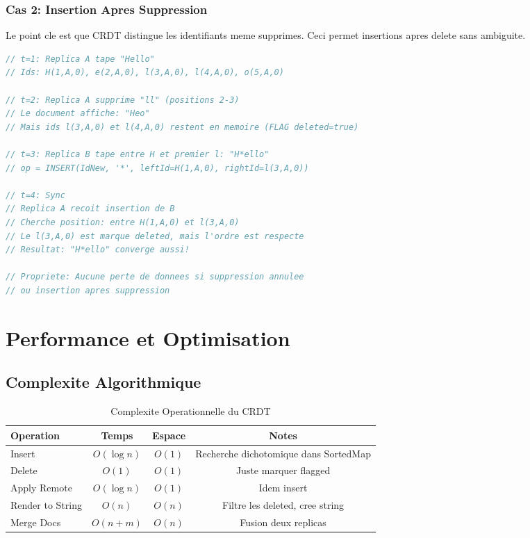 \documentclass[11pt,a4paper,hidelinks]{book}
\begin{document}
\subsubsection{Cas 2: Insertion Apres Suppression}

Le point cle est que CRDT distingue les identifiants meme supprimes. Ceci permet insertions apres delete sans ambiguite.

\begin{lstlisting}[language=Java, caption={Gestion Suppr/Insertion}]
// t=1: Replica A tape "Hello"
// Ids: H(1,A,0), e(2,A,0), l(3,A,0), l(4,A,0), o(5,A,0)

// t=2: Replica A supprime "ll" (positions 2-3)
// Le document affiche: "Heo"
// Mais ids l(3,A,0) et l(4,A,0) restent en memoire (FLAG deleted=true)

// t=3: Replica B tape entre H et premier l: "H*ello"
// op = INSERT(IdNew, '*', leftId=H(1,A,0), rightId=l(3,A,0))

// t=4: Sync
// Replica A recoit insertion de B
// Cherche position: entre H(1,A,0) et l(3,A,0)
// Le l(3,A,0) est marque deleted, mais l'ordre est respecte
// Resultat: "H*ello" converge aussi!

// Propriete: Aucune perte de donnees si suppression annulee
// ou insertion apres suppression
\end{lstlisting}

\section{Performance et Optimisation}

\subsection{Complexite Algorithmique}

\begin{table}[H]
\centering
\caption{Complexite Operationnelle du CRDT}
\begin{tabularx}{\textwidth}{l c c c}
\toprule
\textbf{Operation} & \textbf{Temps} & \textbf{Espace} & \textbf{Notes} \\
\midrule
Insert & $O(\log n)$ & $O(1)$ & Recherche dichotomique dans SortedMap \\
Delete & $O(1)$ & $O(1)$ & Juste marquer flagged \\
Apply Remote & $O(\log n)$ & $O(1)$ & Idem insert \\
Render to String & $O(n)$ & $O(n)$ & Filtre les deleted, cree string \\
Merge Docs & $O(n + m)$ & $O(n)$ & Fusion deux replicas \\
\bottomrule
\end{tabularx}
\end{table}
\end{document}
